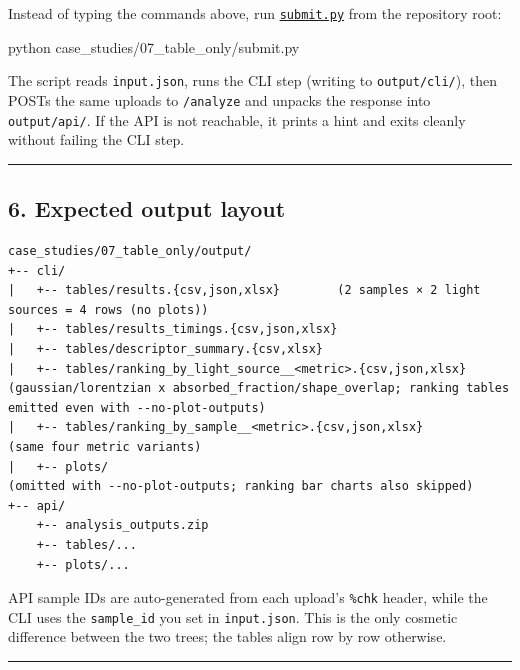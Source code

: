 \documentclass[
  11pt,
]{article}
\newenvironment{Shaded}{}{}
\newcommand{\ExtensionTok}[1]{#1}
\newcommand{\NormalTok}[1]{#1}
\begin{document}
Instead of typing the commands above, run
\href{https://github.com/pinarsyt/overlap-calculator/blob/main/case_studies/07_table_only/submit.py}{\texttt{submit.py}}
from the repository root:

\begin{Shaded}
\begin{Highlighting}[]
\ExtensionTok{python}\NormalTok{ case\_studies/07\_table\_only/submit.py}
\end{Highlighting}
\end{Shaded}

The script reads \texttt{input.json}, runs the CLI step (writing to
\texttt{output/cli/}), then POSTs the same uploads to \texttt{/analyze}
and unpacks the response into \texttt{output/api/}. If the API is not
reachable, it prints a hint and exits cleanly without failing the CLI
step.

\begin{center}\rule{0.5\linewidth}{0.5pt}\end{center}

\hypertarget{6-expected-output-layout}{
\subsection{6. Expected output layout}\label{6-expected-output-layout}}

\begin{verbatim}
case_studies/07_table_only/output/
+-- cli/
|   +-- tables/results.{csv,json,xlsx}        (2 samples × 2 light sources = 4 rows (no plots))
|   +-- tables/results_timings.{csv,json,xlsx}
|   +-- tables/descriptor_summary.{csv,xlsx}
|   +-- tables/ranking_by_light_source__<metric>.{csv,json,xlsx}   (gaussian/lorentzian x absorbed_fraction/shape_overlap; ranking tables emitted even with --no-plot-outputs)
|   +-- tables/ranking_by_sample__<metric>.{csv,json,xlsx}          (same four metric variants)
|   +-- plots/                                                      (omitted with --no-plot-outputs; ranking bar charts also skipped)
+-- api/
    +-- analysis_outputs.zip
    +-- tables/...
    +-- plots/...
\end{verbatim}

API sample IDs are auto-generated from each upload's \texttt{\%chk}
header, while the CLI uses the \texttt{sample\_id} you set in
\texttt{input.json}. This is the only cosmetic difference between the
two trees; the tables align row by row otherwise.

\begin{center}\rule{0.5\linewidth}{0.5pt}\end{center}
\end{document}

